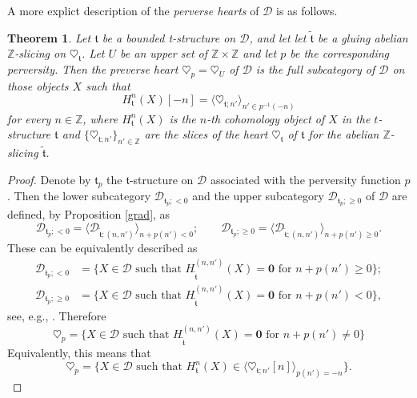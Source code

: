 \documentclass{article}
\newtheorem{thm}{Theorem}[section]
\theoremstyle{definition}
\newcommand{\Z}{\mathbb{Z}}
\newcommand{\tee}{\mathfrak{t}}
\begin{document}
A more explict description of the \emph{perverse hearts} of $\mathscr{D}$ is as follows.
\begin{thm}\label{perverse-heart}
Let $\mathfrak{t}$ be a bounded t-structure on $\mathscr{D}$, and let let $\tilde{\tee}$ be a gluing abelian $\mathbb{Z}$-slicing on $\heartsuit_{\mathfrak{t}}$. Let $U$ be an upper set of $\Z\times \Z$ and let $p$ be the corresponding perversity. Then the preverse heart $\heartsuit_p=\heartsuit_U$ of $\mathscr{D}$ is the full subcategory of $\mathscr{D}$ on those objects $X$ such that 
\[
H_\tee^{n}(X)[-n]= \langle \heartsuit_{\tee;n'}\rangle_{n'\in p^{-1}(-n)}
\]
for every $n\in \Z$, where $H_\tee^{n}(X)$ is the $n$-th cohomology object of $X$ in the $t$-structure $\tee$ and $\{\heartsuit_{\tee;n'}\}_{n'\in \Z}$ are the slices of the heart $\heartsuit_\tee$ of $\tee$ for the abelian $\Z$-slicing $\tilde{\tee}$.
 \end{thm}
 \begin{proof}
 Denote by $\tee_p$ the $\tee$-structure on $\mathscr{D}$ associated with the perversity function $p$. Then the lower subcategory $\mathscr{D}_{\tee_p;<0}$ and the upper subcategory $\mathscr{D}_{\tee_p;\geq 0}$ of $\mathscr{D}$ are defined, by Proposition \ref{grad}, as 
 \[
 \mathscr{D}_{\tee_p;<0}=\langle \mathscr{D}_{\tilde{\tee};(n,n')}\rangle_{n+p(n')<0}; \qquad \mathscr{D}_{\tee_p;\geq 0}=\langle \mathscr{D}_{\tilde{\tee};(n,n')}\rangle_{n+p(n')\geq 0}.
 \]
 These can be equivalently described as
\begin{align*}
 \mathscr{D}_{\tee_p;<0}&=\{X\in \mathscr{D}\text { such that } H_{\tilde{\tee}}^{(n,n')}(X)=\mathbf{0}\text{ for } n+p(n')\geq 0\};\\
   \mathscr{D}_{\tee_p;\geq 0}&=\{X\in \mathscr{D}\text { such that } H_{\tilde{\tee}}^{(n,n')}(X)=\mathbf{0}\text{ for } n+p(n')< 0\},
\end{align*}
 see, e.g., \cite[Remark 4.27]{hearts-and-towers}. Therefore
 \[
 \heartsuit_p=\{X\in \mathscr{D}\text{ such that } H_{\tilde{\tee}}^{(n,n')}(X)=\mathbf{0}\text{ for } n+p(n')\neq 0\}
 \]
 Equivalently, this means that
  \[
 \heartsuit_p=\{X\in \mathscr{D}\text{ such that } H_{\tee}^{n}(X)\in \langle \heartsuit_{\tee;n'}[n]\rangle_{p(n')=-n}\}.
 \]
\end{proof}
\end{document}
